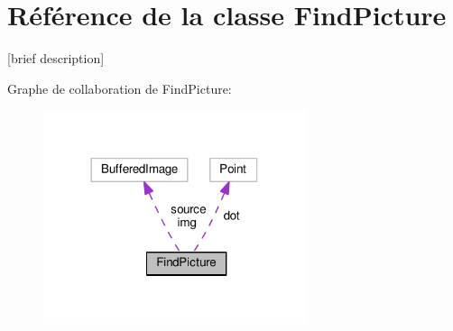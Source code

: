 \hypertarget{classFindPicture}{\section{Référence de la classe Find\+Picture}
\label{classFindPicture}
}


\mbox{[}brief description\mbox{]}  




Graphe de collaboration de Find\+Picture\+:\nopagebreak
\begin{figure}[H]
\begin{center}
\leavevmode
\includegraphics[width=218pt]{classFindPicture__coll__graph}
\end{center}
\end{figure}
